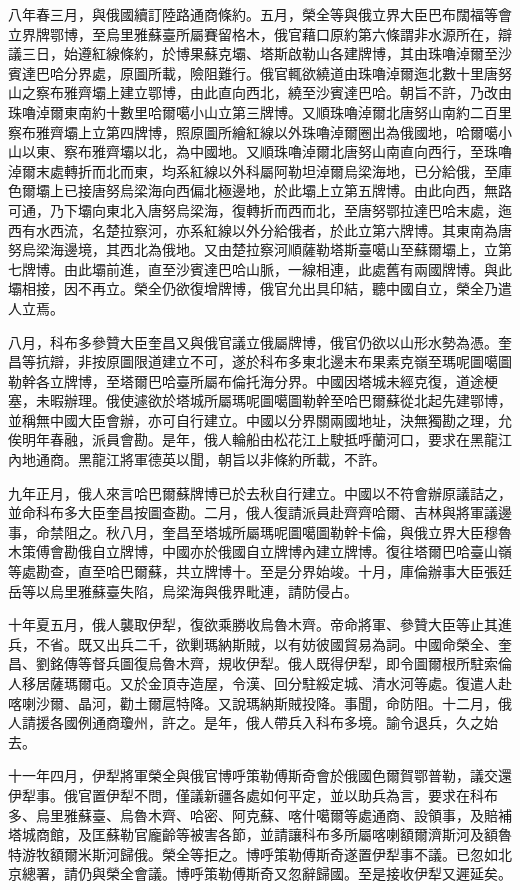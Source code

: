 \begin{pinyinscope}
八年春三月，與俄國續訂陸路通商條約。五月，榮全等與俄立界大臣巴布闊福等會立界牌鄂博，至烏里雅蘇臺所屬賽留格木，俄官藉口原約第六條謂非水源所在，辯議三日，始遵紅線條約，於博果蘇克壩、塔斯啟勒山各建牌博，其由珠嚕淖爾至沙賓達巴哈分界處，原圖所載，險阻難行。俄官輒欲繞道由珠嚕淖爾迤北數十里唐努山之察布雅齊壩上建立鄂博，由此直向西北，繞至沙賓達巴哈。朝旨不許，乃改由珠嚕淖爾東南約十數里哈爾噶小山立第三牌博。又順珠嚕淖爾北唐努山南約二百里察布雅齊壩上立第四牌博，照原圖所繪紅線以外珠嚕淖爾圈出為俄國地，哈爾噶小山以東、察布雅齊壩以北，為中國地。又順珠嚕淖爾北唐努山南直向西行，至珠嚕淖爾末處轉折而北而東，均系紅線以外科屬阿勒坦淖爾烏梁海地，已分給俄，至庫色爾壩上已接唐努烏梁海向西偏北極邊地，於此壩上立第五牌博。由此向西，無路可通，乃下壩向東北入唐努烏梁海，復轉折而西而北，至唐努鄂拉達巴哈末處，迤西有水西流，名楚拉察河，亦系紅線以外分給俄者，於此立第六牌博。其東南為唐努烏梁海邊境，其西北為俄地。又由楚拉察河順薩勒塔斯臺噶山至蘇爾壩上，立第七牌博。由此壩前進，直至沙賓達巴哈山脈，一線相連，此處舊有兩國牌博。與此壩相接，因不再立。榮全仍欲復增牌博，俄官允出具印結，聽中國自立，榮全乃遣人立焉。

八月，科布多參贊大臣奎昌又與俄官議立俄屬牌博，俄官仍欲以山形水勢為憑。奎昌等抗辯，非按原圖限道建立不可，遂於科布多東北邊末布果素克嶺至瑪呢圖噶圖勒幹各立牌博，至塔爾巴哈臺所屬布倫托海分界。中國因塔城未經克復，道途梗塞，未暇辦理。俄使遽欲於塔城所屬瑪呢圖噶圖勒幹至哈巴爾蘇從北起先建鄂博，並稱無中國大臣會辦，亦可自行建立。中國以分界關兩國地址，決無獨勘之理，允俟明年春融，派員會勘。是年，俄人輪船由松花江上駛抵呼蘭河口，要求在黑龍江內地通商。黑龍江將軍德英以聞，朝旨以非條約所載，不許。

九年正月，俄人來言哈巴爾蘇牌博已於去秋自行建立。中國以不符會辦原議詰之，並命科布多大臣奎昌按圖查勘。二月，俄人復請派員赴齊齊哈爾、吉林與將軍議邊事，命禁阻之。秋八月，奎昌至塔城所屬瑪呢圖噶圖勒幹卡倫，與俄立界大臣穆魯木策傅會勘俄自立牌博，中國亦於俄國自立牌博內建立牌博。復往塔爾巴哈臺山嶺等處勘查，直至哈巴爾蘇，共立牌博十。至是分界始竣。十月，庫倫辦事大臣張廷岳等以烏里雅蘇臺失陷，烏梁海與俄界毗連，請防侵占。

十年夏五月，俄人襲取伊犁，復欲乘勝收烏魯木齊。帝命將軍、參贊大臣等止其進兵，不省。既又出兵二千，欲剿瑪納斯賊，以有妨彼國貿易為詞。中國命榮全、奎昌、劉銘傳等督兵圖復烏魯木齊，規收伊犁。俄人既得伊犁，即令圖爾根所駐索倫人移居薩瑪爾屯。又於金頂寺造屋，令漢、回分駐綏定城、清水河等處。復遣人赴喀喇沙爾、晶河，勸土爾扈特降。又說瑪納斯賊投降。事聞，命防阻。十二月，俄人請援各國例通商瓊州，許之。是年，俄人帶兵入科布多境。諭令退兵，久之始去。

十一年四月，伊犁將軍榮全與俄官博呼策勒傅斯奇會於俄國色爾賀鄂普勒，議交還伊犁事。俄官置伊犁不問，僅議新疆各處如何平定，並以助兵為言，要求在科布多、烏里雅蘇臺、烏魯木齊、哈密、阿克蘇、喀什噶爾等處通商、設領事，及賠補塔城商館，及匡蘇勒官龐齡等被害各節，並請讓科布多所屬喀喇額爾濟斯河及額魯特游牧額爾米斯河歸俄。榮全等拒之。博呼策勒傅斯奇遂置伊犁事不議。已忽如北京總署，請仍與榮全會議。博呼策勒傅斯奇又忽辭歸國。至是接收伊犁又遲延矣。


\end{pinyinscope}
